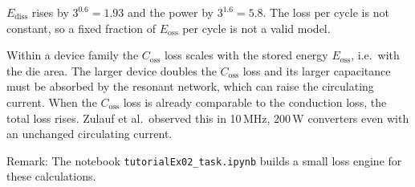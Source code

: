 
\begin{solutionblock}
	$E_\mathrm{diss}$ rises by $3^{0.6}=1.93$ and the power by $3^{1.6}=5.8$. The loss per cycle is not constant, so a fixed fraction of $E_\mathrm{oss}$ per cycle is not a valid model.
\end{solutionblock}


\begin{solutionblock}
	Within a device family the $C_\mathrm{oss}$ loss scales with the stored energy $E_\mathrm{oss}$, i.e.\ with the die area. The larger device doubles the $C_\mathrm{oss}$ loss and its larger capacitance must be absorbed by the resonant network, which can raise the circulating current. When the $C_\mathrm{oss}$ loss is already comparable to the conduction loss, the total loss rises. Zulauf et al.\ observed this in 10\,MHz, 200\,W converters even with an unchanged circulating current.
\end{solutionblock}

\vspace{0.5cm}
Remark: The notebook \texttt{tutorialEx02\_task.ipynb} builds a small loss engine for these calculations.
